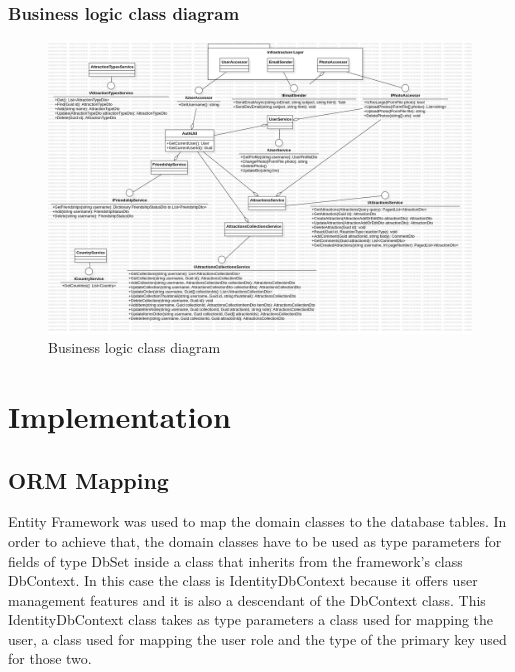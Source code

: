 \subsubsection{Business logic class diagram}

\begin{figure}[!ht]
    \centering
    \includegraphics[width=1\linewidth]{business-class-diagram.png}
    \caption{Business logic class diagram}
    \label{fig:enter-label}
\end{figure}

\section{Implementation}

\subsection{ORM Mapping}

\par Entity Framework was used to map the domain classes to the database tables. In order to achieve that, the domain classes have to be used as type parameters for fields of type DbSet inside a class that inherits from the framework's class DbContext. In this case the class is IdentityDbContext because it offers user management features and it is also a descendant of the DbContext class. This IdentityDbContext class takes as type parameters a class used for mapping the user, a class used for mapping the user role and the type of the primary key used for those two.

